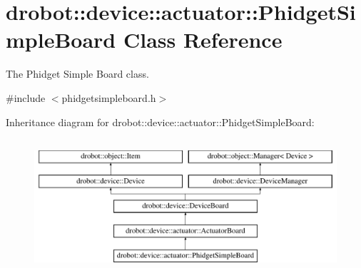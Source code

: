\hypertarget{classdrobot_1_1device_1_1actuator_1_1PhidgetSimpleBoard}{\section{drobot\-:\-:device\-:\-:actuator\-:\-:Phidget\-Simple\-Board Class Reference}
\label{classdrobot_1_1device_1_1actuator_1_1PhidgetSimpleBoard}
}


The Phidget Simple Board class.  




{\ttfamily \#include $<$phidgetsimpleboard.\-h$>$}

Inheritance diagram for drobot\-:\-:device\-:\-:actuator\-:\-:Phidget\-Simple\-Board\-:\begin{figure}[H]
\begin{center}
\leavevmode
\includegraphics[height=5.000000cm]{classdrobot_1_1device_1_1actuator_1_1PhidgetSimpleBoard}
\end{center}
\end{figure}
